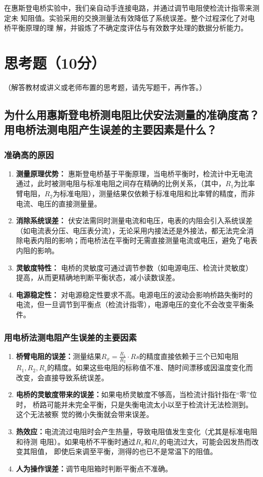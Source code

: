 \documentclass{../../templates/Report}%
\begin{document}
\begin{fullreportonly}
在惠斯登电桥实验中，我们亲自动手连接电路，并通过调节电阻使检流计指零来测定未
知阻值。实验采用的交换测量法有效降低了系统误差。整个过程深化了对电桥平衡原理的理
解，并锻炼了不确定度评估与有效数字处理的数据分析能力。
\section{思考题（10分）}
（解答教材或讲义或老师布置的思考题，请先写题干，再作答。）
\subsection{为什么用惠斯登电桥测电阻比伏安法测量的准确度高？用电桥法测电阻产生误差的主要因素是什么？}

\subsubsection{准确高的原因}
\begin{enumerate}
    \item \textbf{测量原理优势：} 惠斯登电桥基于平衡原理，当电桥平衡时，检流计中无电流通过，此时被测电阻与标准电阻之间存在精确的比例关系，（其中，$R_1$为比率臂电阻，$R_2$为标准电阻），测量结果仅依赖于标准电阻和比率臂的精度，而非电流、电压的直接测量量。

    \item \textbf{消除系统误差：} 伏安法需同时测量电流和电压，电表的内阻会引入系统误差（如电流表分压、电压表分流），无论采用内接法还是外接法，都无法完全消除电表内阻的影响；而电桥法在平衡时无需直接测量电流或电压，避免了电表内阻的影响。

    \item \textbf{灵敏度特性：} 电桥的灵敏度可通过调节参数（如电源电压、检流计灵敏度）提高，从而更精确地判断平衡状态，减小读数误差。

    \item \textbf{电源稳定性：} 对电源稳定性要求不高。电源电压的波动会影响桥路失衡时的电流，但一旦调节到平衡点（检流计指零），电源电压的变化不会改变平衡条件。
\end{enumerate}
\subsubsection{用电桥法测电阻产生误差的主要因素}
\begin{enumerate}
    \item \textbf{桥臂电阻的误差：}测量结果$ R_x = \frac{R_1}{R_2} \cdot Rs $的精度直接依赖于三个已知电阻$R_1, R_2, R_s$的精度。如果这些电阻的标称值不准、随时间漂移或因温度变化而改变，会直接导致系统误差。
    \item \textbf{电桥的灵敏度带来的误差：}如果电桥灵敏度不够高，当检流计指针指在“零”位时，
        桥路可能并未完全平衡，只是失衡电流太小以至于检流计无法检测到。这个无法被察
        觉的微小失衡就会带来误差。
    \item \textbf{热效应：}电流流过电阻时会产生热量，导致电阻值发生变化（尤其是标准电阻和待测
        电阻）。如果电桥不平衡时通过$R_x$和$R_s$的电流过大，可能会因发热而改变其阻值，
        即使后来调至平衡，测得的也已不是常温下的阻值。
    \item \textbf{人为操作误差：}调节电阻箱时判断平衡点不准确。
\end{enumerate}

\end{fullreportonly}
\end{document}
